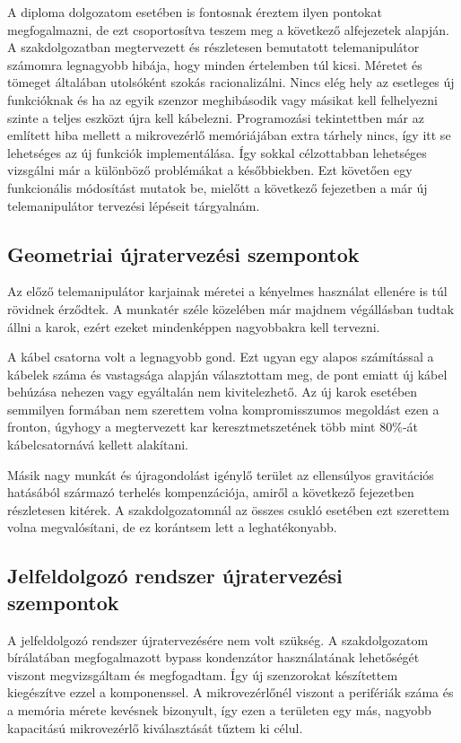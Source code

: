 A diploma dolgozatom esetében is fontosnak éreztem ilyen pontokat megfogalmazni, de ezt csoportosítva teszem meg a következő alfejezetek alapján. A szakdolgozatban megtervezett és részletesen bemutatott telemanipulátor számomra legnagyobb hibája, hogy minden értelemben túl kicsi. Méretet és tömeget általában utolsóként szokás racionalizálni. Nincs elég hely az esetleges új funkcióknak és ha az egyik szenzor meghibásodik vagy másikat kell felhelyezni szinte a teljes eszközt újra kell kábelezni. Programozási tekintettben már az említett hiba mellett a mikrovezérlő memóriájában extra tárhely nincs, így itt se lehetséges az új funkciók implementálása. Így sokkal célzottabban lehetséges vizsgálni már a különböző problémákat a későbbiekben. Ezt követően egy funkcionális módosítást mutatok be, mielőtt a következő fejezetben a már új telemanipulátor tervezési lépéseit tárgyalnám.

\subsection{Geometriai újratervezési szempontok}

Az előző telemanipulátor karjainak méretei a kényelmes használat ellenére is túl rövidnek érződtek. A munkatér széle közelében már majdnem végállásban tudtak állni a karok, ezért ezeket mindenképpen nagyobbakra kell tervezni.

A kábel csatorna volt a legnagyobb gond. Ezt ugyan egy alapos számítással a kábelek száma és vastagsága alapján választottam meg, de pont emiatt új kábel behúzása nehezen vagy egyáltalán nem kivitelezhető. Az új karok esetében semmilyen formában nem szerettem volna kompromisszumos megoldást ezen a fronton, úgyhogy a megtervezett kar keresztmetszetének több mint $80\%$-át kábelcsatornává kellett alakítani.

Másik nagy munkát és újragondolást igénylő terület az ellensúlyos gravitációs hatásából származó terhelés kompenzációja, amiről a következő fejezetben részletesen kitérek. A szakdolgozatomnál az összes csukló esetében ezt szerettem volna megvalósítani, de ez korántsem lett a leghatékonyabb.

\subsection{Jelfeldolgozó rendszer újratervezési szempontok}

A jelfeldolgozó rendszer újratervezésére nem volt szükség. A szakdolgozatom bírálatában megfogalmazott bypass kondenzátor használatának lehetőségét viszont megvizsgáltam és megfogadtam. Így új szenzorokat készítettem kiegészítve ezzel a komponenssel. A mikrovezérlőnél viszont a perifériák száma és a memória mérete kevésnek bizonyult, így ezen a területen egy más, nagyobb kapacitású mikrovezérlő kiválasztását tűztem ki célul.

